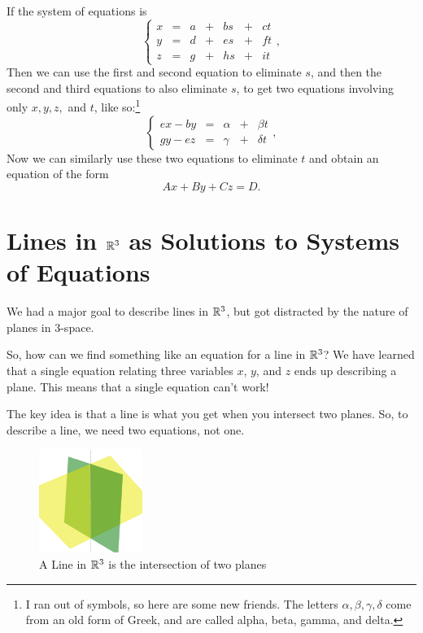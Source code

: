 \documentclass[00-livre-main.tex]{subfiles}
\begin{document}
If the system of equations is
\[
\left\{ \begin{array}{rrrrrrr}
x  &=& a &+& b s &+& c t \\
y  &=& d &+& e s &+& f t \\
z  &=& g &+& h s &+& i t 
\end{array}\right. ,
\]
Then we can use the first and second equation to eliminate $s$, and then the second and third equations to also eliminate $s$, to get two equations involving only $x,y,z,$ and $t$, like so:\footnote{I ran out of symbols, so here are some new friends. The letters $\alpha, \beta, \gamma, \delta$ come from an old form of Greek, and are called alpha, beta, gamma, and delta.}
\[
\left\{ \begin{array}{rrrrr}
ex-by &=& \alpha &+& \beta t \\
gy-ez &=& \gamma &+& \delta t
\end{array}\right. ,
\]
Now we can similarly use these two equations to eliminate $t$ and obtain an equation of the form
\[
Ax+By+Cz = D.
\]


\section*{Lines in $\mathbb{R}^3$ as Solutions to Systems of Equations}

We had a major goal to describe lines in $\mathbb{R}^3$, but got distracted by the nature of planes in $3$-space.

So, how can we find something like an equation for a line in $\mathbb{R}^3$? We have learned that a single equation relating three variables $x$, $y$, and $z$ ends up describing a plane. This means that a single equation can't work!

The key idea is that a line is what you get when you intersect two planes. So, to describe a line, we need two equations, not one.

\begin{figure}[h]
\centering
\includegraphics[width=0.3\textwidth]{images/two-planes-intersect.png}
\caption{A Line in $\mathbb{R}^3$ is the intersection of two planes}
\label{fig:two-planes-redux}
\end{figure}
\end{document}
